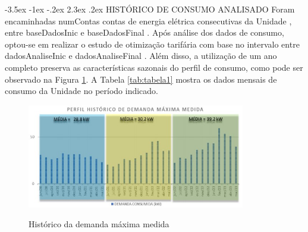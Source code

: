 \documentclass[a4paper,12pt]{abntex2}
\makeatletter
\renewcommand\chapter{\@startsection{chapter}{0}{\z@}%
  {-3.5ex \@plus -1ex \@minus -.2ex}%
  {2.3ex \@plus.2ex}%
  {\normalfont\Large\bfseries}}
\makeatother
\begin{document}
\chapter{HISTÓRICO DE CONSUMO ANALISADO}
Foram  encaminhadas  {{ numContas }}  contas  de  energia  elétrica  consecutivas  da  {{ Unidade }}, 
entre  {{ baseDadosInic }} e {{ baseDadosFinal }}. Após análise dos dados de consumo, optou-se em realizar 
o  estudo  de  otimização  tarifária  com  base  no  intervalo  entre  {{ dadosAnaliseInic }}  e
{{ dadosAnaliseFinal }}.  Além  disso,  a  utilização  de  um  ano  completo  preserva  as  características 
sazonais do perfil de consumo, como pode ser observado na Figura \ref{fig:grafico1}. A Tabela \ref{tab:tabela1} mostra 
os dados mensais de consumo da {{ Unidade }} no período indicado.


\begin{figure}[!ht]
    \centering
    \caption{Histórico da demanda máxima medida}
    \includegraphics[width=0.85\textwidth]{templates/FIGS/grafico1}
    \label{fig:grafico1}
\end{figure}
\end{document}
